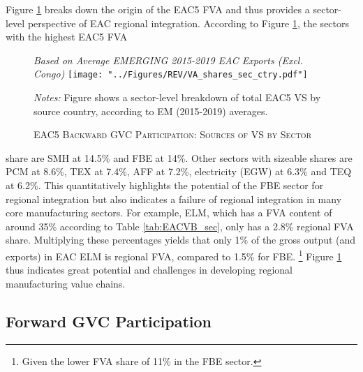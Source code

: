 \documentclass[a4paper]{article}
\begin{document}
 Figure \ref{fig:EACVB_ctry_sec} breaks down the origin of the EAC5 FVA and thus provides a sector-level perspective of EAC regional integration. According to Figure \ref{fig:EACVB_ctry_sec}, the sectors with the highest EAC5 FVA

\begin{figure}[h!] 
\centering
\caption{\label{fig:EACVB_ctry_sec}\textsc{EAC5 Backward GVC Participation: Sources of VS by Sector}}
\small{\textit{Based on Average EMERGING 2015-2019 EAC Exports (Excl. Congo)}}
\vspace{2mm}
\texttt{[image: "../Figures/REV/VA\_shares\_sec\_ctry.pdf"]} \\ 
\raggedright
\scriptsize
\vspace{-3mm}
\emph{Notes:} Figure shows a sector-level breakdown of total EAC5 VS by source country, according to EM (2015-2019) averages. \\ \vspace{-10mm}
\end{figure}
\FloatBarrier 

\noindent share are SMH at 14.5\% and FBE at 14\%. Other sectors with sizeable shares are PCM at 8.6\%, TEX at 7.4\%, AFF at 7.2\%, electricity (EGW) at 6.3\% and TEQ at 6.2\%. This quantitatively highlights the potential of the FBE sector for regional integration but also indicates a failure of regional integration in many core manufacturing sectors. For example, ELM, which has a FVA content of around 35\% according to Table \ref{tab:EACVB_sec}, only has a 2.8\% regional FVA share. Multiplying these percentages yields that only 1\% of the gross output (and exports) in EAC ELM is regional FVA, compared to 1.5\% for FBE. \footnote{Given the lower FVA share of 11\% in the FBE sector.} Figure \ref{fig:EACVB_ctry_sec} thus indicates great potential and challenges in developing regional manufacturing value chains. 



\subsection{Forward GVC Participation}
\end{document}
